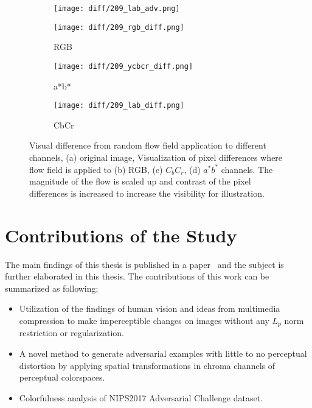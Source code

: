 \begin{figure}[t]
    \centering
    \begin{subfigure}[b]{.4\linewidth}
        \texttt{[image: diff/209\_lab\_adv.png]}
        \caption{}
    \end{subfigure}
    \begin{subfigure}[b]{.4\linewidth}
        \texttt{[image: diff/209\_rgb\_diff.png]}
        \caption{RGB}
    \end{subfigure}
    \begin{subfigure}[b]{.4\linewidth}
        \texttt{[image: diff/209\_ycbcr\_diff.png]}
        \caption{a*b*}
    \end{subfigure}
    \begin{subfigure}[b]{.4\linewidth}
        \texttt{[image: diff/209\_lab\_diff.png]}
        \caption{CbCr}
    \end{subfigure}
    \caption{Visual difference from random flow field application to different channels, (a) original image, Visualization of pixel differences where flow field is applied to (b) RGB, (c) \(C_{b}C_{r}\), (d) \(a^*b^*\) channels. The magnitude of the flow is scaled up and contrast of the pixel differences is increased to increase the visibility for illustration. }\label{fig:diff}
\end{figure}


\section{Contributions of the Study}

The main findings of this thesis is published in a paper~\cite{aydin2019imperceptible} and the subject is further elaborated in this thesis. The contributions of this work can be summarized as following;
\begin{itemize}
    \item Utilization of the findings of human vision and ideas from multimedia compression to make imperceptible changes on images without any \(L_p\) norm restriction or regularization.
    \item A novel method to generate adversarial examples with little to no perceptual distortion by applying spatial transformations in chroma channels of perceptual colorspaces.
    \item Colorfulness analysis of NIPS2017 Adversarial Challenge dataset.
\end{itemize}

